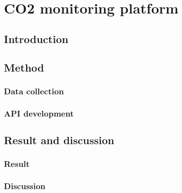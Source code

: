 \chapter{CO2 monitoring platform}
\renewcommand{\headrulewidth}{0pt}
\lhead[\thepage]{\leftmark}
\rhead[\leftmark]{\thepage}
\cfoot[]{}

\section{Introduction}

\section{Method}
\subsection{Data collection}
\subsection{API development}

\section{Result and discussion}
\subsection{Result}
\subsection{Discussion}